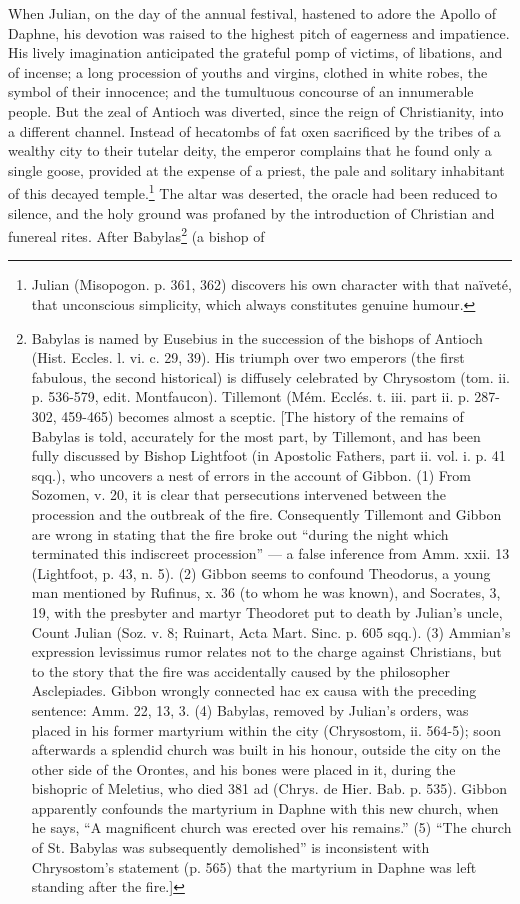 When Julian, on the day of the annual festival, hastened to adore the Apollo of Daphne, his devotion was raised to the highest pitch of eagerness and impatience. His lively imagination anticipated the grateful pomp of victims, of libations, and of incense; a long procession of youths and virgins, clothed in white robes, the symbol of their innocence; and the tumultuous concourse of an innumerable people. But the zeal of Antioch was diverted, since the reign of Christianity, into a different channel. Instead of hecatombs of fat oxen sacrificed by the tribes of a wealthy city to their tutelar deity, the emperor complains that he found only a single goose, provided at the expense of a priest, the pale and solitary inhabitant of this decayed temple.\footnote{Julian (Misopogon. p. 361, 362) discovers his own character with that naïveté, that unconscious simplicity, which always constitutes genuine humour.} The altar was deserted, the oracle had been reduced to silence, and the holy ground was profaned by the introduction of Christian and funereal rites. After Babylas\footnote{Babylas is named by Eusebius in the succession of the bishops of Antioch (Hist. Eccles. l. vi. c. 29, 39). His triumph over two emperors (the first fabulous, the second historical) is diffusely celebrated by Chrysostom (tom. ii. p. 536-579, edit. Montfaucon). Tillemont (Mém. Ecclés. t. iii. part ii. p. 287-302, 459-465) becomes almost a sceptic. [The history of the remains of Babylas is told, accurately for the most part, by Tillemont, and has been fully discussed by Bishop Lightfoot (in Apostolic Fathers, part ii. vol. i. p. 41 sqq.), who uncovers a nest of errors in the account of Gibbon. (1) From Sozomen, v. 20, it is clear that persecutions intervened between the procession and the outbreak of the fire. Consequently Tillemont and Gibbon are wrong in stating that the fire broke out \texthebrew{“}during the night which terminated this indiscreet procession\texthebrew{” —} a false inference from Amm. xxii. 13 (Lightfoot, p. 43, n. 5). (2) Gibbon seems to confound Theodorus, a young man mentioned by Rufinus, x. 36 (to whom he was known), and Socrates, 3, 19, with the presbyter and martyr Theodoret put to death by Julian\texthebrew{}’s uncle, Count Julian (Soz. v. 8; Ruinart, Acta Mart. Sinc. p. 605 sqq.). (3) Ammian\texthebrew{}’s expression levissimus rumor relates not to the charge against Christians, but to the story that the fire was accidentally caused by the philosopher Asclepiades. Gibbon wrongly connected hac ex causa with the preceding sentence: Amm. 22, 13, 3. (4) Babylas, removed by Julian\texthebrew{}’s orders, was placed in his former martyrium within the city (Chrysostom, ii. 564-5); soon afterwards a splendid church was built in his honour, outside the city on the other side of the Orontes, and his bones were placed in it, during the bishopric of Meletius, who died 381 ad (Chrys. de Hier. Bab. p. 535). Gibbon apparently confounds the martyrium in Daphne with this new church, when he says, \texthebrew{“}A magnificent church was erected over his remains.\texthebrew{}” (5) \texthebrew{“}The church of St. Babylas was subsequently demolished\texthebrew{}” is inconsistent with Chrysostom\texthebrew{}’s statement (p. 565) that the martyrium in Daphne was left standing after the fire.]} (a bishop of 